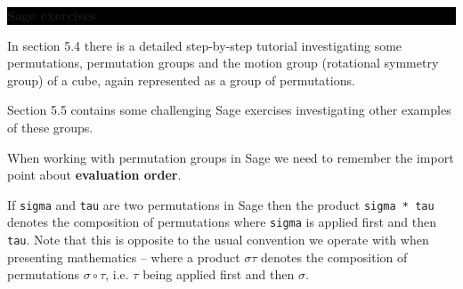 \documentclass[oneside,10pt]{amsart}
\newcommand{\cbox}[1]{\colorbox{black}{\begin{minipage}{\linewidth}\color{white}\sffamily #1 \end{minipage}}}
\newcommand{\gbox}[1]{\colorbox{gray!30}{\begin{minipage}{\linewidth}\color{black} #1 \end{minipage}}}
\newcommand{\topic}[1]{\cbox{\textbf{#1}}\vskip 4pt}
\begin{document}
\vskip 4pt

\topic{Sage exercises}
In section 5.4 there is a detailed step-by-step tutorial investigating some permutations, permutation groups and the motion group (rotational symmetry group) of a cube, again represented as a group of permutations.

Section 5.5 contains some challenging Sage exercises investigating other examples of these groups.

When working with permutation groups in Sage we need to remember the import point about \textbf{evaluation order}.\\
\gbox{If \texttt{sigma} and \texttt{tau} are two permutations in Sage then the product \texttt{sigma * tau} denotes the composition of permutations where \texttt{sigma} is applied first and then \texttt{tau}. Note that this is opposite to the usual convention we operate with when presenting mathematics -- where a product $\sigma \tau$ denotes the composition of permutations $\sigma \circ \tau$, i.e. $\tau$ being applied first and then $\sigma$.}
\end{document}
